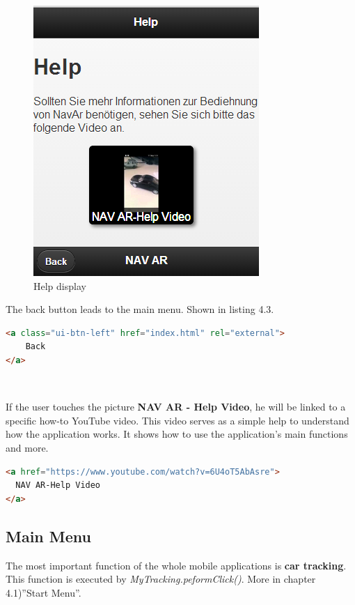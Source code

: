 \begin{figure}[h]
\centering
\includegraphics[width=0.5\linewidth]{graphics/chapter4/2}
\caption{Help display}
\end{figure}


The back button leads to the main menu. Shown in listing 4.3.
\\
\begin{lstlisting}[language=html, caption= 
Back button,captionpos=b]
<a class="ui-btn-left" href="index.html" rel="external">
	Back
</a>
\end{lstlisting}
\
\


If the user touches the picture \textbf{NAV AR - Help Video}, he will be linked to a specific how-to YouTube video. This video serves as a simple help to understand how the application works. It shows how to use the application's main functions and more.
\\

\begin{lstlisting}[language=html, caption= 
Help video,captionpos=b]
<a href="https://www.youtube.com/watch?v=6U4oT5AbAsre">
  NAV AR-Help Video
</a>
\end{lstlisting}


\subsection{Main Menu}
The most important function of the whole mobile applications is \textbf{car tracking}. This function is executed by \textit{MyTracking.peformClick()}. More in chapter 4.1)''Start Menu''.
\\

